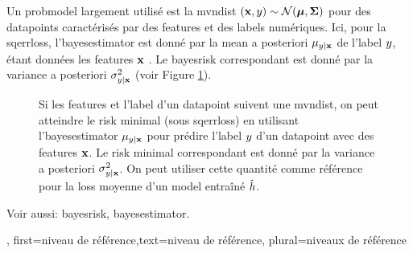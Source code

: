 {{		Un \gls{probmodel} largement utilisé est la \gls{mvndist} $\left( {\bf x},y \right) \sim \mathcal{N}({\bm \mu},{\bm \Sigma})$ 
		pour des \glspl{datapoint} caractérisés par des \glspl{feature} et des \glspl{label} numériques.
		Ici, pour la \gls{sqerrloss}, l’\gls{bayesestimator} est donné par la \gls{mean} a posteriori 
		$\mu_{y|{\bf x}}$ de l’\gls{label} $y$, étant données les 
		\glspl{feature} ${\bf x}$ \cite{LC,GrayProbBook}. Le \gls{bayesrisk} correspondant 
		est donné par la \gls{variance} a posteriori 
		$\sigma^{2}_{y|{\bf x}}$ (voir Figure \ref{fig_post_baseline_dict}).
		\begin{figure}[H]
			\begin{center}
			\end{center}
			\caption{Si les \glspl{feature} et l’\gls{label} d’un \gls{datapoint} suivent une \gls{mvndist}, on 
				peut atteindre le \gls{risk} minimal (sous \gls{sqerrloss}) en utilisant l’\gls{bayesestimator} $\mu_{y|{\bf x}}$ 
				pour prédire l’\gls{label} $y$ d’un \gls{datapoint} avec des \glspl{feature} ${\bf x}$. Le \gls{risk} minimal
				correspondant est donné par la \gls{variance} a posteriori $\sigma^{2}_{y|{\bf x}}$. On peut utiliser 
				cette quantité comme référence pour la \gls{loss} moyenne d’un \gls{model} entraîné $\hat{h}$. \label{fig_post_baseline_dict}}
	\end{figure}
	Voir aussi: \gls{bayesrisk}, \gls{bayesestimator}.},
	first={niveau de référence},text={niveau de référence}, plural={niveaux de référence}}

